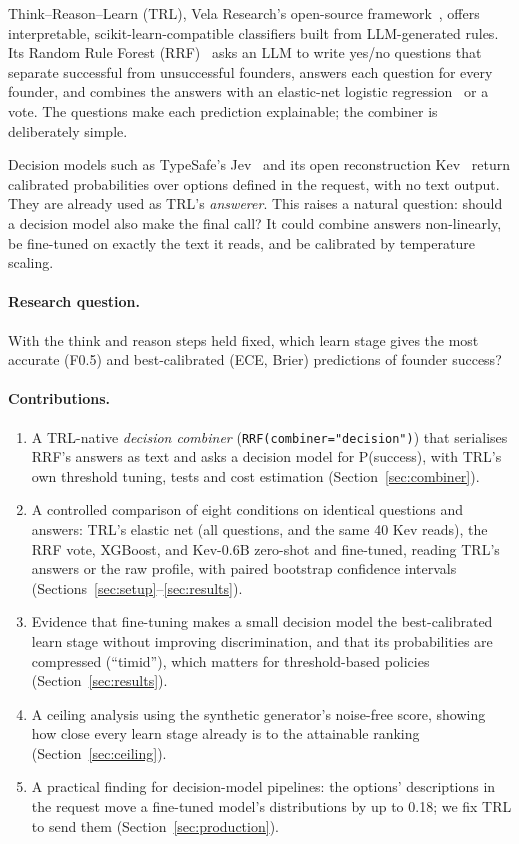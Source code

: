 \documentclass{article}
\begin{document}
Think--Reason--Learn (TRL), Vela Research's open-source framework~\citep{trl}, offers
interpretable, scikit-learn-compatible classifiers built from LLM-generated rules. Its Random
Rule Forest (RRF)~\citep{trlresearch} asks an LLM to write yes/no questions that separate
successful from unsuccessful founders, answers each question for every founder, and combines
the answers with an elastic-net logistic regression~\citep{zou2005elasticnet} or a vote. The
questions make each prediction explainable; the combiner is deliberately simple.

Decision models such as TypeSafe's Jev~\citep{jev} and its open reconstruction Kev~\citep{kev}
return calibrated probabilities over options defined in the request, with no text output. They
are already used as TRL's \emph{answerer}. This raises a natural question: should a decision
model also make the final call? It could combine answers non-linearly, be fine-tuned on exactly
the text it reads, and be calibrated by temperature scaling.

\paragraph{Research question.} With the think and reason steps held fixed, which learn stage
gives the most accurate (F0.5) and best-calibrated (ECE, Brier) predictions of founder success?

\paragraph{Contributions.}
\begin{enumerate}
\item A TRL-native \emph{decision combiner} (\texttt{RRF(combiner="decision")}) that serialises
  RRF's answers as text and asks a decision model for P(success), with TRL's own threshold
  tuning, tests and cost estimation (Section~\ref{sec:combiner}).
\item A controlled comparison of eight conditions on identical questions and answers: TRL's
  elastic net (all questions, and the same 40 Kev reads), the RRF vote, XGBoost, and Kev-0.6B
  zero-shot and fine-tuned, reading TRL's answers or the raw profile, with paired bootstrap
  confidence intervals (Sections~\ref{sec:setup}--\ref{sec:results}).
\item Evidence that fine-tuning makes a small decision model the best-calibrated learn stage
  without improving discrimination, and that its probabilities are compressed (``timid''), which
  matters for threshold-based policies (Section~\ref{sec:results}).
\item A ceiling analysis using the synthetic generator's noise-free score, showing how close
  every learn stage already is to the attainable ranking (Section~\ref{sec:ceiling}).
\item A practical finding for decision-model pipelines: the options' descriptions in the request
  move a fine-tuned model's distributions by up to 0.18; we fix TRL to send them
  (Section~\ref{sec:production}).
\end{enumerate}
\end{document}

